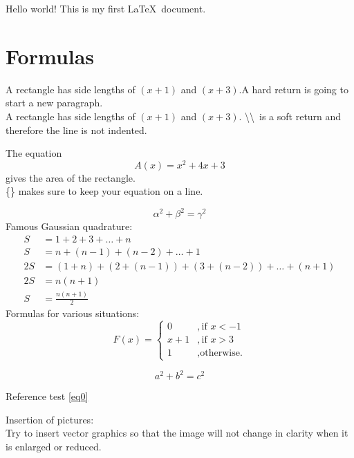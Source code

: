 \documentclass[12pt]{article}
\begin{document}
Hello world! This is my first \LaTeX\ document. 
\newpage
\section{Formulas}
A rectangle has side lengths of $(x+1)$ and $(x+3)$.A hard return is going to start a new paragraph.\\
A rectangle has side lengths of $(x+1)$ and $(x+3)$. \textbackslash\textbackslash\ is a soft return and therefore the line is not indented.

The equation $${A(x)=x^2+4x+3}$$ gives the area of the rectangle.\\
\{\} makes sure to keep your equation on a line.

\begin{equation}\label{eq0}
    \alpha^2+\beta^2=\gamma^2
\end{equation}
Famous Gaussian quadrature:
\begin{equation}
    \begin{split}
        S&=1+2+3+\dots+n\\
        S&=n+(n-1)+(n-2)+\dots+1\\
        2S&=(1+n)+(2+(n-1))+(3+(n-2))+\dots+(n+1)\\
        2S&=n(n+1)\\
        S&=\frac{n(n+1)}{2} 
    \end{split}
\end{equation}
Formulas for various situations:
\begin{equation}
    F(x)=
    \begin{cases}
        0&,\text{if $x<-1$}\\
        x+1&,\text{if $x>3$}\\
        1&,\text{otherwise.}
    \end{cases}
\end{equation}

\[
    a^2+b^2=c^2
\]

Reference test \autoref{eq0}

Insertion of pictures:\\
Try to insert vector graphics so that the image will not change in clarity when it is enlarged or reduced.
\end{document}
